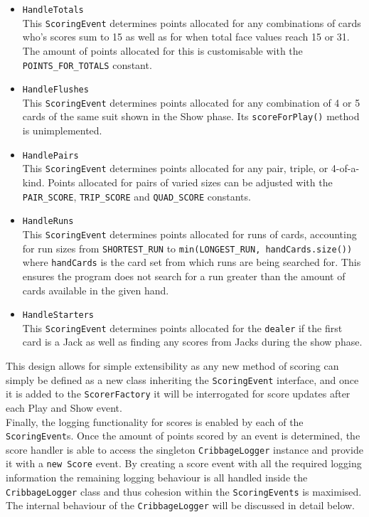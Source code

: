 \documentclass{article}
\begin{document}
\begin{multicols}{2}
    \begin{itemize}
        \item \verb|HandleTotals|\\[2mm]
        This \verb|ScoringEvent| determines points allocated for any combinations of cards who's scores sum to 15 as well as for when total face values reach 15 or 31. The amount of points allocated for this is customisable with the \verb|POINTS_FOR_TOTALS| constant.
        \item \verb|HandleFlushes|\\[2mm]
        This \verb|ScoringEvent| determines points allocated for any combination of 4 or 5 cards of the same suit shown in the Show phase. Its \verb|scoreForPlay()| method is unimplemented.
        \item \verb|HandlePairs|\\[2mm]
        This \verb|ScoringEvent| determines points allocated for any pair, triple, or 4-of-a-kind. Points allocated for pairs of varied sizes can be adjusted with the \verb|PAIR_SCORE|, \verb|TRIP_SCORE| and \verb|QUAD_SCORE| constants.
        \item \verb|HandleRuns|\\[2mm]
        This \verb|ScoringEvent| determines points allocated for runs of cards, accounting for run sizes from \verb|SHORTEST_RUN| to \verb|min(LONGEST_RUN, handCards.size())| where \verb|handCards| is the card set from which runs are being searched for. This ensures the program does not search for a run greater than the amount of cards available in the given hand.
        \item \verb|HandleStarters|\\[2mm]
        This \verb|ScoringEvent| determines points allocated for the \verb|dealer| if the first card is a Jack as well as finding any scores from Jacks during the show phase.
    \end{itemize}
\end{multicols}
\noindent This design allows for simple extensibility as any new method of scoring can simply be defined as a new class inheriting the \verb|ScoringEvent| interface, and once it is added to the \verb|ScorerFactory| it will be interrogated for score updates after each Play and Show event.\\[2mm]
Finally, the logging functionality for scores is enabled by each of the \verb|ScoringEvent|s. Once the amount of points scored by an event is determined, the score handler is able to access the singleton \verb|CribbageLogger| instance and provide it with a \verb|new Score| event. By creating a score event with all the required logging information the remaining logging behaviour is all handled inside the \verb|CribbageLogger| class and thus cohesion within the \verb|ScoringEvents| is maximised. The internal behaviour of the \verb|CribbageLogger| will be discussed in detail below.
\end{document}
